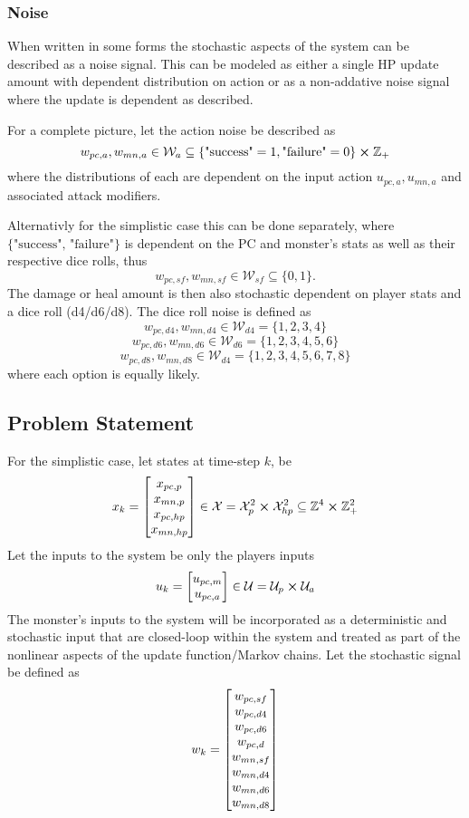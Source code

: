 \documentclass[9pt, onecolumn]{report}
\newcommand{\Z}{\mathbb{Z}}
\begin{document}
\subsubsection{Noise}
When written in some forms the stochastic aspects of the system can be described as a noise signal.
This can be modeled as either a single HP update amount with dependent distribution on action or as a non-addative noise signal where the update is dependent as described. 

For a complete picture, let the action noise be described as \[
    w_{pc,a}, w_{mn,a} \in \mathcal{W}_{a} \subseteq \{\text{"success"} = 1, \text{"failure"} = 0\} \cross \Z_{+}
\] where the distributions of each are dependent on the input action $u_{pc,a}, u_{mn,a}$ and associated attack modifiers.

Alternativly for the simplistic case this can be done separately, where $\{\text{"success", "failure"}\}$ is dependent on the PC and monster's stats as well as their respective dice rolls, thus \[
    w_{pc,sf}, w_{mn,sf} \in \mathcal{W}_{sf} \subseteq \{0, 1\}
    .
\]
The damage or heal amount is then also stochastic dependent on player stats and a dice roll (d4/d6/d8).
The dice roll noise is defined as \[
    w_{pc,d4}, w_{mn,d4} \in \mathcal{W}_{d4} = \{1,2,3,4\}
\] \[
    w_{pc,d6}, w_{mn,d6} \in \mathcal{W}_{d6} = \{1,2,3,4,5,6\}
\] \[
    w_{pc,d8}, w_{mn,d8} \in \mathcal{W}_{d4} = \{1,2,3,4,5,6,7,8\}
\] where each option is equally likely.

\subsection{Problem Statement}
For the simplistic case, let states at time-step $k$, be \[
    x_k = \mqty[x_{pc,p}\\x_{mn,p}\\x_{pc,hp}\\x_{mn,hp}] \in \mathcal{X} = \mathcal{X}_p^2 \cross \mathcal{X}_{hp}^2 \subseteq \Z^{4} \cross \Z_{+}^{2}
\] Let the inputs to the system be only the players inputs \[
    u_k = \mqty[u_{pc,m}\\u_{pc,a}] \in \mathcal{U} = \mathcal{U}_{p} \cross \mathcal{U}_{a} %
\] The monster's inputs to the system will be incorporated as a deterministic and stochastic input that are closed-loop within the system and treated as part of the nonlinear aspects of the update function/Markov chains.
Let the stochastic signal be defined as \[
    w_k = \mqty[w_{pc,sf}\\w_{pc,d4}\\w_{pc,d6}\\w_{pc,d}\\w_{mn,sf}\\w_{mn,d4}\\w_{mn,d6}\\w_{mn,d8}]
\]
\end{document}
